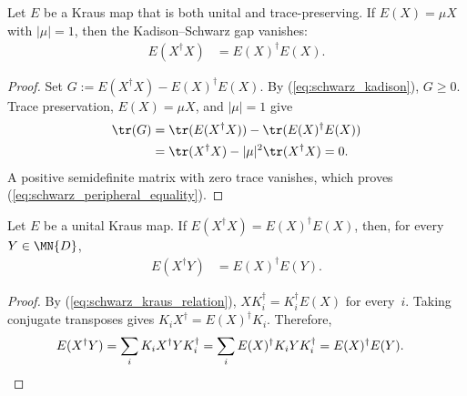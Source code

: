 \begin{theorem}\label{thm:ks_peripheral}
    \leanok
    Let $E$ be a Kraus map that is both unital and trace-preserving.
    If $E(X) = \mu X$ with $|\mu| = 1$, then the Kadison--Schwarz gap
    vanishes:
    \begin{align}
        E(X^\dagger X)
        &= E(X)^\dagger E(X).
        \label{eq:schwarz_peripheral_equality}
    \end{align}
\end{theorem}

\begin{proof}
    \leanok
    Set $G:=E(X^\dagger X)-E(X)^\dagger E(X)$. By
    (\ref{eq:schwarz_kadison}), $G\geq0$. Trace preservation,
    $E(X)=\mu X$, and $|\mu|=1$ give
    \begin{align}
        \tr(G)
        &= \tr(E(X^\dagger X))-\tr(E(X)^\dagger E(X))
        \notag\\
        &= \tr(X^\dagger X)-|\mu|^2\tr(X^\dagger X)
        =0.
        \notag
    \end{align}
    A positive semidefinite matrix with zero trace vanishes, which proves
    (\ref{eq:schwarz_peripheral_equality}).
\end{proof}

\begin{theorem}\label{thm:left_multiplicative_identity}
    \leanok
    Let $E$ be a unital Kraus map.
    If $E(X^\dagger X) = E(X)^\dagger E(X)$, then, for every
    $Y \in \MN{D}$,
    \begin{align}
        E(X^\dagger Y)
        &= E(X)^\dagger E(Y).
        \label{eq:schwarz_left_multiplicative}
    \end{align}
\end{theorem}

\begin{proof}
    \leanok
    By (\ref{eq:schwarz_kraus_relation}),
    $X K_i^\dagger=K_i^\dagger E(X)$ for every~$i$. Taking conjugate
    transposes gives $K_iX^\dagger=E(X)^\dagger K_i$. Therefore,
    \begin{align}
        E(X^\dagger Y)
        &= \sum_i K_iX^\dagger YK_i^\dagger
        = \sum_i E(X)^\dagger K_iYK_i^\dagger
        = E(X)^\dagger E(Y).
        \notag
    \end{align}
\end{proof}

